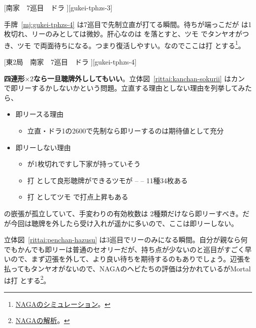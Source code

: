 \documentclass[../nankiru_main.tex]{subfiles}
\begin{document}
[南家　7巡目　ドラ ][gukei-tphzs-3]

手牌~\ref{mj:gukei-tphzs-4} は7巡目で先制立直が打てる瞬間。待ちが端っこだが  は1枚切れ、リーのみとしては微妙。肝心なのは  を落とすと、ツモ  でタンヤオがつき、ツモ  で両面待ちになる。つまり復活しやすい。なのでここは打  とする\footnote{\href{https://naga.dmv.nico/htmls/69d21f40394a565f3ee6a034487617f3dee470af4e003da5777fb99e7349faa2v2_2.html?tw=2}{NAGAのシミュレーション}。}。

[東2局　南家　7巡目　ドラ ][gukei-tphzs-4]

\textbf{四連形$\times 2$なら一旦聴牌外ししてもいい}\citep[][pp.~184--185]{fkt}。立体図~\ref{rittai:kanchan-sokurii} はカン  で即リーするかしないかという問題。立直する理由としない理由を列挙してみたら、

\begin{itemize}
  \item 即リースる理由
  \begin{itemize}
    \item 立直・ドラ1の2600で先制なら即リーするのは期待値として充分
  \end{itemize}
  \item 即リーしない理由
  \begin{itemize}
    \item {} が1枚切れですし下家が持っていそう
    \item 打  として良形聴牌ができるツモが  --  --  11種34枚ある
    \item 打  としてツモ  で打点上昇もある
  \end{itemize}
\end{itemize}

 の嵌張が孤立していて、手変わりの有効枚数は  2種類だけなら即リーすべき。だが今回は聴牌を外したら受け入れが遥かに多いので、ここは即リーしない。

\begin{rittai}[h]
  \centering
  \caption{}
  \label{rittai:kanchan-sokurii}
\end{rittai}

立体図~\ref{rittai:penchan-hazusu} は3巡目でリーのみになる瞬間。自分が親なら何でもかんでも即リーは普通のセオリーだが、持ち点が少ないのと巡目がすごく早いので、まず辺張を外して、より良い待ちを期待するのもありでしょう。辺張を払ってもタンヤオがないので、NAGAのヘビたちの評価は分かれているがMortalは打  とする\footnote{\href{https://naga.dmv.nico/htmls/b1ce439d70b8dfc48152e539f75e29d57763308a9de1dfafc95f65a9529f2757v2_2.html?tw=2}{NAGAの解析}。}。
\end{document}
